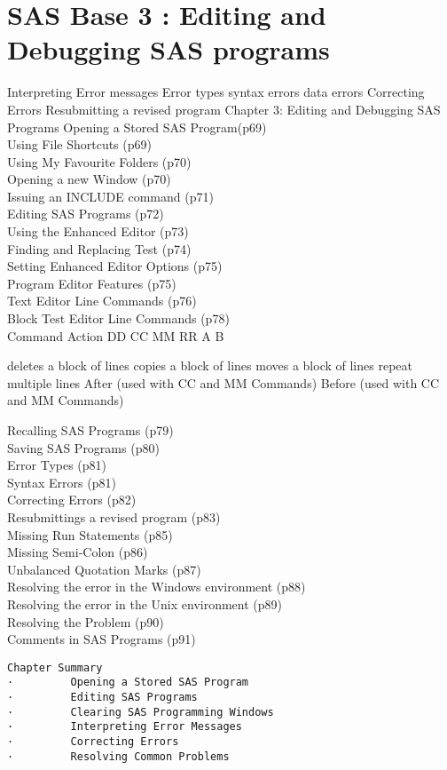 \section{SAS Base 3 : Editing and Debugging SAS programs}
Interpreting Error messages
Error types
syntax errors
data errors
Correcting Errors
Resubmitting a revised program
Chapter 3:  Editing and Debugging SAS Programs
Opening a Stored SAS Program(p69)\\
Using File Shortcuts (p69)\\
Using My Favourite Folders (p70)\\
Opening a new Window (p70)\\
Issuing an INCLUDE command (p71)\\
Editing SAS Programs (p72)\\
Using the Enhanced Editor (p73)\\
Finding and Replacing Test (p74)\\
Setting Enhanced Editor Options (p75)\\
Program Editor Features (p75)\\
Text Editor Line Commands (p76)\\
Block Test Editor Line Commands (p78)\\
Command
Action
DD
CC
MM
RR
A
B

deletes a block of lines
copies a block of lines
moves a block of lines
repeat multiple lines
After (used with CC and MM Commands)
Before (used with CC and MM Commands)

Recalling SAS Programs (p79)\\
Saving SAS Programs (p80)\\
Error Types (p81)\\
Syntax Errors (p81)\\
Correcting Errors (p82)\\
Resubmittings a revised program (p83)\\
Missing Run Statements (p85)\\
Missing Semi-Colon (p86)\\
Unbalanced Quotation Marks (p87)\\
Resolving the error in the Windows environment (p88)\\
Resolving the error in the Unix environment (p89)\\
Resolving the Problem (p90)\\
Comments in SAS Programs (p91)\\
\begin{verbatim}
Chapter Summary
·         Opening a Stored SAS Program
·         Editing SAS Programs
·         Clearing SAS Programming Windows
·         Interpreting Error Messages
·         Correcting Errors
·         Resolving Common Problems
\end{verbatim}
